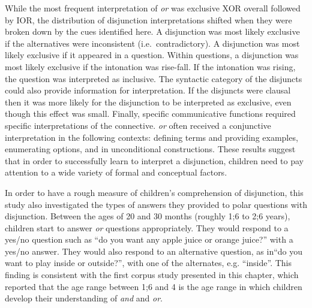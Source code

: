 \documentclass[oneside]{report}
\theoremstyle{definition}
\theoremstyle{definition}
\theoremstyle{definition}
\theoremstyle{remark}
\begin{document}
While the most frequent interpretation of \emph{or} was exclusive XOR
overall followed by IOR, the distribution of disjunction interpretations
shifted when they were broken down by the cues identified here. A
disjunction was most likely exclusive if the alternatives were
inconsistent (i.e.~contradictory). A disjunction was most likely
exclusive if it appeared in a question. Within questions, a disjunction
was most likely exclusive if the intonation was rise-fall. If the
intonation was rising, the question was interpreted as inclusive. The
syntactic category of the disjuncts could also provide information for
interpretation. If the disjuncts were clausal then it was more likely
for the disjunction to be interpreted as exclusive, even though this
effect was small. Finally, specific communicative functions required
specific interpretations of the connective. \emph{or} often received a
conjunctive interpretation in the following contexts: defining terms and
providing examples, enumerating options, and in unconditional
constructions. These results suggest that in order to successfully learn
to interpret a disjunction, children need to pay attention to a wide
variety of formal and conceptual factors.

In order to have a rough measure of children's comprehension of
disjunction, this study also investigated the types of answers they
provided to polar questions with disjunction. Between the ages of 20 and
30 months (roughly 1;6 to 2;6 years), children start to answer \emph{or}
questions appropriately. They would respond to a yes/no question such as
``do you want any apple juice or orange juice?'' with a yes/no answer.
They would also respond to an alternative question, as in``do you want
to play inside or outside?'', with one of the alternates, e.g.
``inside''. This finding is consistent with the first corpus study
presented in this chapter, which reported that the age range between 1;6
and 4 is the age range in which children develop their understanding of
\emph{and} and \emph{or}.
\end{document}
